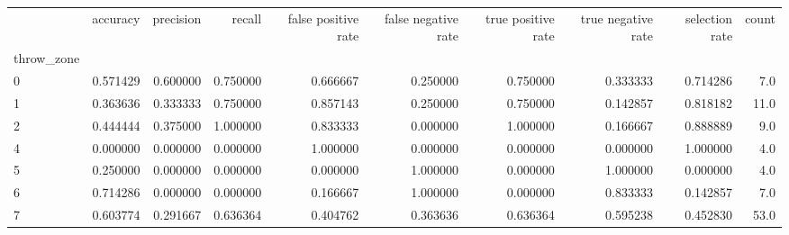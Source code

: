 \begin{tabular}{lrrrrrrrrr}
\toprule
{} &  accuracy &  precision &    recall &  false positive rate &  false negative rate &  true positive rate &  true negative rate &  selection rate &  count \\
throw\_zone &           &            &           &                      &                      &                     &                     &                 &        \\
\midrule
0          &  0.571429 &   0.600000 &  0.750000 &             0.666667 &             0.250000 &            0.750000 &            0.333333 &        0.714286 &    7.0 \\
1          &  0.363636 &   0.333333 &  0.750000 &             0.857143 &             0.250000 &            0.750000 &            0.142857 &        0.818182 &   11.0 \\
2          &  0.444444 &   0.375000 &  1.000000 &             0.833333 &             0.000000 &            1.000000 &            0.166667 &        0.888889 &    9.0 \\
4          &  0.000000 &   0.000000 &  0.000000 &             1.000000 &             0.000000 &            0.000000 &            0.000000 &        1.000000 &    4.0 \\
5          &  0.250000 &   0.000000 &  0.000000 &             0.000000 &             1.000000 &            0.000000 &            1.000000 &        0.000000 &    4.0 \\
6          &  0.714286 &   0.000000 &  0.000000 &             0.166667 &             1.000000 &            0.000000 &            0.833333 &        0.142857 &    7.0 \\
7          &  0.603774 &   0.291667 &  0.636364 &             0.404762 &             0.363636 &            0.636364 &            0.595238 &        0.452830 &   53.0 \\
\bottomrule
\end{tabular}
